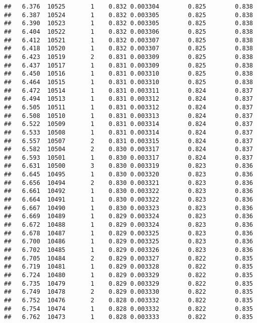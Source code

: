 \documentclass[
]{book}
\begin{document}
\begin{verbatim}
##   6.376  10525       1    0.832 0.003304        0.825        0.838
##   6.387  10524       1    0.832 0.003305        0.825        0.838
##   6.390  10523       1    0.832 0.003305        0.825        0.838
##   6.404  10522       1    0.832 0.003306        0.825        0.838
##   6.412  10521       1    0.832 0.003307        0.825        0.838
##   6.418  10520       1    0.832 0.003307        0.825        0.838
##   6.423  10519       2    0.831 0.003309        0.825        0.838
##   6.437  10517       1    0.831 0.003309        0.825        0.838
##   6.450  10516       1    0.831 0.003310        0.825        0.838
##   6.464  10515       1    0.831 0.003310        0.825        0.838
##   6.472  10514       1    0.831 0.003311        0.824        0.837
##   6.494  10513       1    0.831 0.003312        0.824        0.837
##   6.505  10511       1    0.831 0.003312        0.824        0.837
##   6.508  10510       1    0.831 0.003313        0.824        0.837
##   6.522  10509       1    0.831 0.003314        0.824        0.837
##   6.533  10508       1    0.831 0.003314        0.824        0.837
##   6.557  10507       2    0.831 0.003315        0.824        0.837
##   6.582  10504       2    0.830 0.003317        0.824        0.837
##   6.593  10501       1    0.830 0.003317        0.824        0.837
##   6.631  10500       3    0.830 0.003319        0.823        0.836
##   6.645  10495       1    0.830 0.003320        0.823        0.836
##   6.656  10494       2    0.830 0.003321        0.823        0.836
##   6.661  10492       1    0.830 0.003322        0.823        0.836
##   6.664  10491       1    0.830 0.003322        0.823        0.836
##   6.667  10490       1    0.830 0.003323        0.823        0.836
##   6.669  10489       1    0.829 0.003324        0.823        0.836
##   6.672  10488       1    0.829 0.003324        0.823        0.836
##   6.678  10487       1    0.829 0.003325        0.823        0.836
##   6.700  10486       1    0.829 0.003325        0.823        0.836
##   6.702  10485       1    0.829 0.003326        0.823        0.836
##   6.705  10484       2    0.829 0.003327        0.822        0.835
##   6.719  10481       1    0.829 0.003328        0.822        0.835
##   6.724  10480       1    0.829 0.003329        0.822        0.835
##   6.735  10479       1    0.829 0.003329        0.822        0.835
##   6.749  10478       2    0.829 0.003330        0.822        0.835
##   6.752  10476       2    0.828 0.003332        0.822        0.835
##   6.754  10474       1    0.828 0.003332        0.822        0.835
##   6.762  10473       1    0.828 0.003333        0.822        0.835

\end{verbatim}
\end{document}

